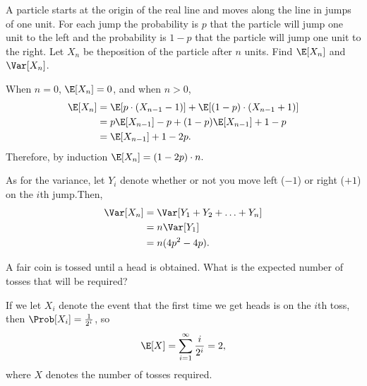 \documentclass[a4paper]{article}
\begin{document}
\begin{Exercise}
	A particle starts at the origin of the real line and moves along the line in jumps of one unit. For each jump the probability is $p$ that the particle will jump one unit to the left and the probability is $1 - p$ that the particle will jump one unit to the right. Let $X_n$ be theposition of the particle after $n$ units. Find $\E[X_n]$ and $\Var[X_n]$.
\end{Exercise}
\begin{Solution}
	When $n = 0$, $\E[X_n] = 0$, and when $n > 0$,
	\begin{align*}
		\E[X_n] &= \E[p \cdot (X_{n - 1} - 1)] + \E[(1 - p) \cdot (X_{n - 1} + 1)]
		     \\ &= p \E[X_{n - 1}] - p + (1 - p) \E[X_{n - 1}] + 1 - p
		     \\ &= \E[X_{n - 1}] + 1 - 2p.
	\end{align*}
	Therefore, by induction $\E[X_n] = (1 - 2p) \cdot n.$ 

	As for the variance, let $Y_i$ denote whether or not you move left ($-1$) or right ($+1$) on the $i$th jump.Then,
	\begin{align*}
		\Var[X_n] &= \Var[Y_1 + Y_2 + \ldots + Y_n]
		       \\ &= n \Var[Y_1]
		       \\ &= n (4p^2 - 4p).
	\end{align*}
\end{Solution}
\begin{Exercise}
	A fair coin is tossed until a head is obtained. What is the expected number of tosses that will be required?
\end{Exercise}
\begin{Solution}
	If we let $X_i$ denote the event that the first time we get heads is on the $i$th toss, then $\Prob[X_i] = \frac{1}{2^i}$, so
	\begin{align*}
		\E[X] = \sum_{i = 1}^{\infty} \frac{i}{2^i} = 2,
	\end{align*}
	where $X$ denotes the number of tosses required.
\end{Solution}
\end{document}
